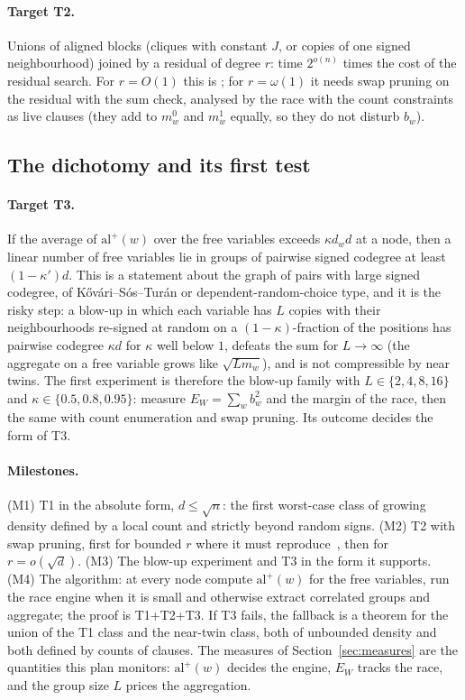 \documentclass[11pt,a4paper]{article}
\theoremstyle{definition}
\theoremstyle{remark}
\begin{document}
\paragraph{Target T2.} Unions of aligned blocks (cliques with constant $J$,
or copies of one signed neighbourhood) joined by a residual of degree $r$:
time $2^{o(n)}$ times the cost of the residual search. For $r=O(1)$ this is
\cite{NT}; for $r=\omega(1)$ it needs swap pruning on the residual with the
sum check, analysed by the race with the count constraints as live clauses
(they add to $m^0_w$ and $m^1_w$ equally, so they do not disturb $b_w$).

\subsection{The dichotomy and its first test}

\paragraph{Target T3.} If the average of $\mathrm{al}^+(w)$ over the free
variables exceeds $\kappa d_wd$ at a node, then a linear number of free
variables lie in groups of pairwise signed codegree at least $(1-\kappa')d$.
This is a statement about the graph of pairs with large signed codegree, of
K\H{o}v\'ari--S\'os--Tur\'an or dependent-random-choice type, and it is the
risky step: a blow-up in which each variable has $L$ copies with their
neighbourhoods re-signed at random on a $(1-\kappa)$-fraction of the positions
has pairwise codegree $\kappa d$ for $\kappa$ well below $1$, defeats the sum
for $L\to\infty$ (the aggregate on a free variable grows like $\sqrt{L m_w}$),
and is not compressible by near twins. The first experiment is therefore the
blow-up family with $L\in\{2,4,8,16\}$ and $\kappa\in\{0.5,0.8,0.95\}$:
measure $E_W=\sum_wb_w^2$ and the margin of the race, then the same with
count enumeration and swap pruning. Its outcome decides the form of T3.

\paragraph{Milestones.} (M1) T1 in the absolute form, $d\le\sqrt n$: the first
worst-case class of growing density defined by a local count and strictly
beyond random signs. (M2) T2 with swap pruning, first for bounded $r$ where it
must reproduce~\cite{NT}, then for $r=o(\sqrt d)$. (M3) The blow-up
experiment and T3 in the form it supports. (M4) The algorithm: at every node
compute $\mathrm{al}^+(w)$ for the free variables, run the race engine when it
is small and otherwise extract correlated groups and aggregate; the proof is
T1+T2+T3. If T3 fails, the fallback is a theorem for the union of the T1 class
and the near-twin class, both of unbounded density and both defined by
counts of clauses. The measures of Section~\ref{sec:measures} are the
quantities this plan monitors: $\mathrm{al}^+(w)$ decides the engine, $E_W$
tracks the race, and the group size $L$ prices the aggregation.
\end{document}
